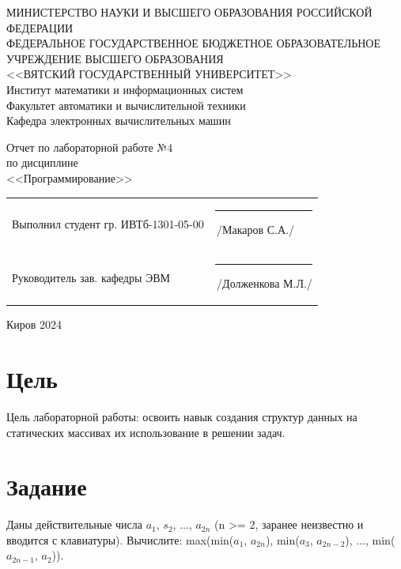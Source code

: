 \documentclass[a4paper,14pt]{extarticle}
\begin{document}
  \newpage\thispagestyle{empty}
  \begin{center}
    \MakeUppercase{
      Министерство науки и высшего образования Российской Федерации\\
      Федеральное государственное бюджетное образовательное учреждение высшего образования\\
      <<Вятский Государственный Университет>>\\
    }
    Институт математики и информационных систем\\
    Факультет автоматики и вычислительной техники\\
    Кафедра электронных вычислительных машин
  \end{center}
  \vfill

  \begin{center}
    Отчет по лабораторной работе №4\\
    по дисциплине\\
    <<Программирование>>\\
  \end{center}
  \vfill

  \noindent
  \begin{tabular}{ll}
    Выполнил студент гр. ИВТб-1301-05-00 \hspace{5mm} &
    \rule[-1mm]{25mm}{0.10mm}\,/Макаров С.А./\\
    
    Руководитель зав. кафедры ЭВМ & \rule[-1mm]{25mm}{0.10mm}\,/Долженкова М.Л./\\
  \end{tabular}

  \vfill
  \begin{center}
    Киров 2024
  \end{center}

  \newpage
  \section*{Цель}
  Цель лабораторной работы: освоить навык создания структур данных на статических массивах их использование в решении задач.

  \section*{Задание}
  Даны действительные числа $a_1$, $s_2$, ..., $a_{2n}$ (n >= 2, заранее неизвестно и вводится с клавиатуры). Вычислите: max(min($a_1$, $a_{2n}$), min($a_3$, $a_{2n-2}$), ..., min($a_{2n-1}$, $a_2$)).
\end{document}
